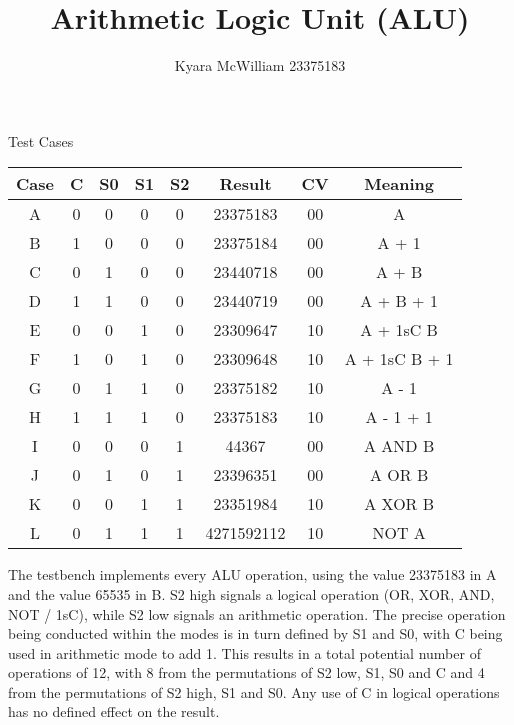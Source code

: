 \documentclass{article}
\title{Arithmetic Logic Unit (ALU)}
\author{Kyara McWilliam 23375183}
\date{}
\begin{document}
\maketitle

Test Cases
\hfill \break

\begin{tabular}{ |c|c|c|c|c|c|c|c| }
\hline
Case & C & S0 & S1 & S2 & Result & CV & Meaning \\
\hline
A & 0 & 0 & 0 & 0 & 23375183 & 00 & A \\
B & 1 & 0 & 0 & 0 & 23375184 & 00 & A + 1 \\
C & 0 & 1 & 0 & 0 & 23440718 & 00 & A + B \\
D & 1 & 1 & 0 & 0 & 23440719 & 00 & A + B + 1 \\
E & 0 & 0 & 1 & 0 & 23309647 & 10 & A + 1sC B \\
F & 1 & 0 & 1 & 0 & 23309648 & 10 & A + 1sC B + 1 \\
G & 0 & 1 & 1 & 0 & 23375182 & 10 & A - 1 \\
H & 1 & 1 & 1 & 0 & 23375183 & 10 & A - 1 + 1 \\
I & 0 & 0 & 0 & 1 & 44367 & 00 & A AND B \\
J & 0 & 1 & 0 & 1 & 23396351 & 00 & A OR B \\
K & 0 & 0 & 1 & 1 & 23351984 & 10 & A XOR B \\
L & 0 & 1 & 1 & 1 & 4271592112 & 10 & NOT A \\
\hline
\end{tabular}
\hfill \break \break
The testbench implements every ALU operation, using the value 23375183 in A and the value 65535 in B. 
\hfill \break \break
S2 high signals a logical operation (OR, XOR, AND, NOT / 1sC),  while S2 low signals an arithmetic operation. The precise operation being conducted within the modes is in turn defined by S1 and S0, with C being used in arithmetic mode to add 1.
\hfill \break \break
This results in a total potential number of operations of 12, with 8 from the permutations of S2 low, S1, S0 and C and 4 from the permutations of S2 high, S1 and S0. Any use of C in logical operations has no defined effect on the result.
\end{document}
